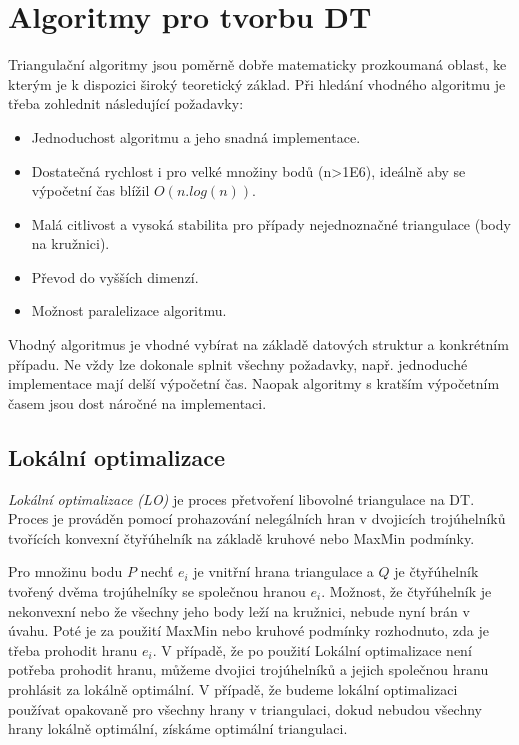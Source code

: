 \documentclass[12pt,a4paper]{article}
\begin{document}
\section{Algoritmy pro tvorbu DT}
\label{sec:algoritmy}
Triangulační algoritmy jsou poměrně dobře matematicky prozkoumaná
oblast, ke kterým je k dispozici široký teoretický základ. Při hledání
vhodného algoritmu je třeba zohlednit následující požadavky:
\begin{itemize}
\item Jednoduchost algoritmu a jeho snadná implementace.
\item Dostatečná rychlost i pro velké množiny bodů (n>1E6), ideálně aby se výpočetní čas blížil $O(n . log(n))$.
\item Malá citlivost a vysoká stabilita pro případy nejednoznačné triangulace (body na kružnici).
\item Převod do vyšších dimenzí.
\item Možnost paralelizace algoritmu.
\end{itemize}
Vhodný algoritmus je vhodné vybírat na základě datových struktur a
konkrétním případu. Ne vždy lze dokonale splnit všechny požadavky,
např. jednoduché implementace mají delší výpočetní čas. Naopak
algoritmy s kratším výpočetním časem jsou dost náročné na
implementaci.

\newpage
\subsection{Lokální optimalizace}
\emph{Lokální optimalizace (LO)} je proces přetvoření libovolné
triangulace na DT. Proces je prováděn pomocí prohazování nelegálních
hran v dvojicích trojúhelníků tvořících konvexní čtyřúhelník na
základě kruhové nebo MaxMin podmínky.

Pro množinu bodu $P$ nechť $e_i$ je vnitřní hrana triangulace a $Q$ je
čtyřúhelník tvořený dvěma trojúhelníky se společnou hranou
$e_i$. Možnost, že čtyřúhelník je nekonvexní nebo že všechny jeho body leží
na kružnici, nebude nyní brán v úvahu. Poté je za použití MaxMin nebo
kruhové podmínky rozhodnuto, zda je třeba prohodit hranu $e_i$. V
případě, že po použití Lokální optimalizace není potřeba prohodit
hranu, můžeme dvojici trojúhelníků a jejich společnou hranu prohlásit
za lokálně optimální. V případě, že budeme lokální optimalizaci
používat opakovaně pro všechny hrany v triangulaci, dokud nebudou
všechny hrany lokálně optimální, získáme optimální triangulaci.
\end{document}

